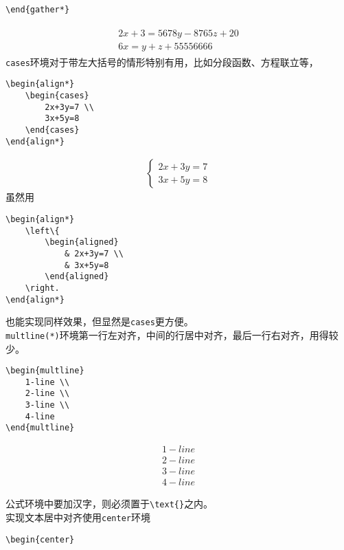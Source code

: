 \documentclass[fontset=windows]{article}
\begin{document}
\begin{multicols}{2}
\begin{enumerate}
\begin{lstlisting}
\end{gather*}    
\end{lstlisting} 
\begin{gather}
    \boxed{
    \begin{gathered}
        2x+3 = 5678y-8765z + 20 \label{aaa2}\\
        6x = y+z + 55556666 
    \end{gathered} }
\end{gather}
\verb|cases|环境对于带左大括号的情形特别有用，比如分段函数、方程联立等，
\begin{lstlisting}
\begin{align*}
    \begin{cases}
        2x+3y=7 \\
        3x+5y=8
    \end{cases}
\end{align*}    
\end{lstlisting} 
\begin{align*}
    \boxed{
    \begin{cases}
        2x+3y=7 \\
        3x+5y=8
    \end{cases} }
\end{align*}
虽然用
\begin{lstlisting}
\begin{align*}
    \left\{  
        \begin{aligned}
            & 2x+3y=7 \\
            & 3x+5y=8
        \end{aligned}  
    \right.
\end{align*}    
\end{lstlisting} 
也能实现同样效果，但显然是\verb|cases|更方便。\\
\verb|multline(*)|环境第一行左对齐，中间的行居中对齐，最后一行右对齐，用得较少。
\begin{lstlisting}
\begin{multline}
    1-line \\
    2-line \\
    3-line \\
    4-line 
\end{multline}    
\end{lstlisting}
\begin{tcolorbox} 
    \vspace{-5mm}
    \begin{multline}
        1-line \\
        2-line \\
        3-line \\
        4-line 
    \end{multline}
\end{tcolorbox}
公式环境中要加汉字，则必须置于\verb|\text{}|之内。\\
实现文本居中对齐使用\verb|center|环境
\begin{lstlisting}
\begin{center}


\end{lstlisting}
\end{enumerate}
\end{multicols}
\end{document}
